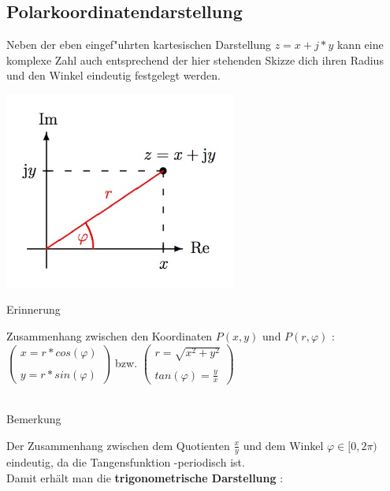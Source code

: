 	\subsection{Polarkoordinatendarstellung}

		Neben der eben eingef"uhrten kartesischen Darstellung $z =x+j*y$ kann eine komplexe Zahl auch entsprechend der hier stehenden Skizze dich ihren Radius  und den Winkel  eindeutig festgelegt werden.

		\includegraphics[width=3in]{kap6/komplexezahlen4}

		\begin{Bemerkung}
		Erinnerung\\
		\end{Bemerkung}

		Zusammenhang zwischen den Koordinaten $P(x,y)$ und $P(r,\varphi)$ :\\

		$
		\begin{pmatrix}
		x=r*cos(\varphi)\\
		\\
		y=r*sin(\varphi)
		\end{pmatrix}
		$
		bzw.
		$
		\begin{pmatrix}
		r= \sqrt{x^2+y^2}\\
		\\
		tan(\varphi) = \frac{y}{x}
		\end{pmatrix}
		$
		\\
		\\

		\begin{Bemerkung}
		Bemerkung\\
		\end{Bemerkung}

		Der Zusammenhang zwischen dem Quotienten $\frac{x}{y}$ und dem Winkel $\varphi \in [0,2\pi)$ eindeutig, da die Tangensfunktion -periodisch ist.\\
		Damit erhält man die \textbf{trigonometrische Darstellung} :\\

